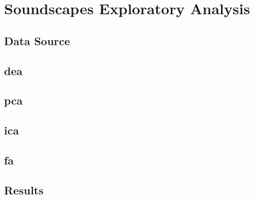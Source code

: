 


\chapter{Soundscapes Exploratory Analysis}
\label{chap:sondea}

\section{Data Source}
\label{sec:data-source}


\section{\acrfull{dea}}
\label{sec:sondea}

\section{\acrfull{pca}}
\label{sec:pca}

\section{\acrfull{ica}}
\label{sec:ica}

\section{\acrfull{fa}}
\label{sec:fa}

\section{Results}
\label{sec:dea-results}
